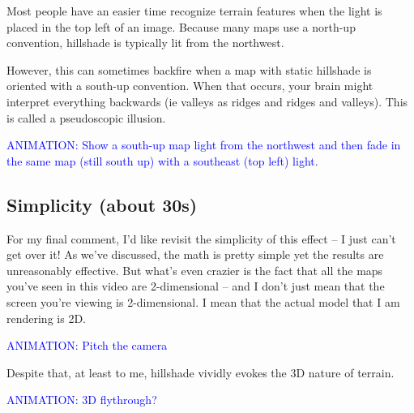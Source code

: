 \documentclass{article}
\newcommand\animation[1]{\textcolor{blue}{ANIMATION: #1}}
\begin{document}
Most people have an easier time recognize terrain features when the light is placed in the top left of an image.
Because many maps use a north-up convention, hillshade is typically lit from the northwest.

However, this can sometimes backfire when a map with static hillshade is oriented with a south-up convention.
When that occurs, your brain might interpret everything backwards (ie valleys as ridges and ridges and valleys).
This is called a pseudoscopic illusion.

\animation{Show a south-up map light from the northwest and then fade in the same map (still south up) with a southeast (top left) light}.

\subsection{Simplicity (about 30s)}

For my final comment, I'd like revisit the simplicity of this effect -- I just can't get over it!
As we've discussed, the math is pretty simple yet the results are unreasonably effective.
But what's even crazier is the fact that all the maps you've seen in this video are 2-dimensional -- and I don't just mean that the screen you're viewing is 2-dimensional.
I mean that the actual model that I am rendering is 2D.

\animation{Pitch the camera}

Despite that, at least to me, hillshade vividly evokes the 3D nature of terrain.

\animation{3D flythrough?}
\end{document}
